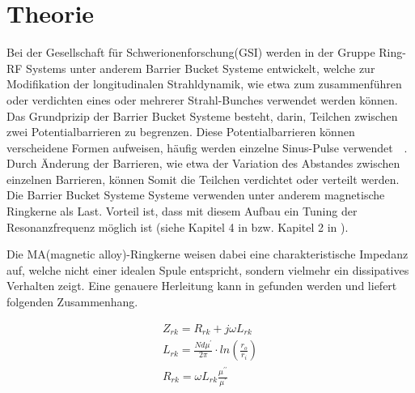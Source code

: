 \section{Theorie}

Bei der Gesellschaft für Schwerionenforschung(GSI) werden in der Gruppe Ring-RF Systems unter anderem  Barrier Bucket Systeme entwickelt, welche zur Modifikation der longitudinalen Strahldynamik, wie etwa zum zusammenf\"uhren oder verdichten eines oder mehrerer Strahl-Bunches verwendet werden k\"onnen. 
Das Grundprizip der Barrier Bucket Systeme besteht, darin, Teilchen zwischen zwei Potentialbarrieren zu begrenzen. Diese Potentialbarrieren k\"onnen verscheidene Formen aufweisen, h\"aufig werden einzelne Sinus-Pulse verwendet~\citep{harzheim2016modeling}~\citep{lee1997particle}. Durch \"Anderung der Barrieren, wie etwa der Variation des Abstandes zwischen einzelnen Barrieren, k\"onnen Somit die Teilchen verdichtet oder verteilt werden.
Die Barrier Bucket Systeme Systeme verwenden unter anderem magnetische Ringkerne als Last. Vorteil ist, dass mit diesem Aufbau ein Tuning der Resonanzfrequenz m\"oglich ist (siehe Kapitel 4 in \citep{Klingbeil2015} bzw. Kapitel 2 in \citep{bast2017ba}).
\par
Die MA(magnetic alloy)-Ringkerne weisen dabei eine charakteristische Impedanz auf, welche nicht einer idealen Spule entspricht, sondern vielmehr ein dissipatives Verhalten zeigt. Eine genauere Herleitung kann in \citep{Klingbeil2015} gefunden werden und liefert folgenden Zusammenhang. 


\begin{align}
Z_{rk} = R_{rk} + j\omega L_{rk}\label{eq_01}\\
L_{rk} = \frac{Nd\mu^\prime}{2\pi}\cdot ln(\frac{r_o}{r_i})\label{eq_02}\\
R_{rk} = \omega L_{rk} \frac{\mu^{\prime\prime}}{\mu^{\prime}}\label{eq_03}
\end{align}



